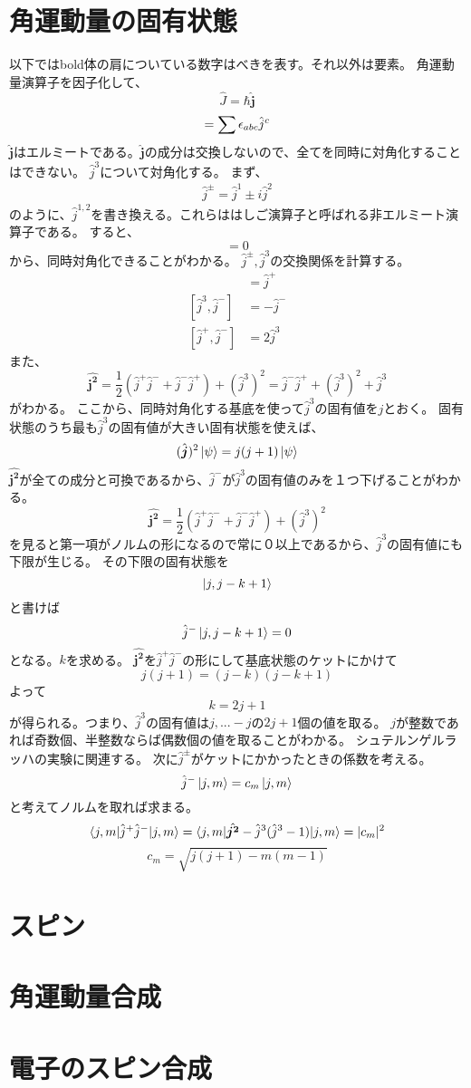 \documentclass{jsarticle}
\newcommand{\half}{\frac{1}{2}}
\newcommand{\beq}{\begin{equation}}
\newcommand{\eeq}{\end{equation}}
\newcommand{\hj}{\hat{j}}
\newcommand{\hjm}{\hat{j}^{-}}
\newcommand{\hjp}{\hat{j}^{+}}
\newcommand{\hbj}{\hat{\bm{j}}}
\newcommand{\hbjt}{\hat{\bm{j^2}}}
\newcommand{\hcj}{\hat{J}}
\newcommand{\cjm}{\sqrt{j(j+1) - m(m-1)}}
\begin{document}
\section{角運動量の固有状態}
以下ではbold体の肩についている数字はべきを表す。それ以外は要素。
角運動量演算子を因子化して、
\beq
    \hcj = \hbar \hbj
\eeq
\beq
[\hj^a,\hj^b] = \sum \epsilon_{abc}\hj^c\\
\eeq
$\hbj$はエルミートである。$\hbj$の成分は交換しないので、全てを同時に対角化することはできない。
$\hj^3$について対角化する。
まず、
\begin{align}
    \hj^{\pm} = \hj^1 \pm i \hj^2
\end{align}
のように、$\hj^{1,2}$を書き換える。これらははしご演算子と呼ばれる非エルミート演算子である。
すると、
\beq
[\hbjt,\hj^3] = 0
\eeq
から、同時対角化できることがわかる。
$\hj^{\pm},\hj^3$の交換関係を計算する。
\begin{align}
    [\hj^3, \hj^{+}] &= \hj^{+}\\
[\hj^3, \hj^{-}] &= -\hj^{-}\\
[\hj^{+}, \hj^{-}] &= 2\hj^{3}
\end{align}
また、
\beq
\hbjt = \half (\hjp\hjm + \hjm\hjp) + (\hj^3)^2 =  \hjm\hjp + (\hj^3)^2 + \hj^3
\eeq
がわかる。
ここから、同時対角化する基底を使って$\hj^3$の固有値を$j$とおく。
固有状態のうち最も$\hj^3$の固有値が大きい固有状態を使えば、
\beq
    (\hbj)^2 \ket{\psi} = j(j+1)\ket{\psi}
\eeq
$\hbjt$が全ての成分と可換であるから、$\hjm$が$\hj^3$の固有値のみを１つ下げることがわかる。
\beq
\hbjt = \half (\hjp\hjm + \hjm\hjp) + (\hj^3)^2
\eeq
を見ると第一項がノルムの形になるので常に０以上であるから、$\hj^3$の固有値にも下限が生じる。
その下限の固有状態を
\beq
    \ket{j, j-k+1}
\eeq
と書けば
\beq
    \hjm\ket{j, j-k+1} = 0
\eeq
となる。$k$を求める。
$\hbjt$を$\hjp\hjm$の形にして基底状態のケットにかけて
\beq
    j(j+1) = (j-k)(j-k+1)
\eeq
よって
\beq
    k = 2j + 1
\eeq
が得られる。つまり、$\hj^3$の固有値は$j,...-j$の$2j+1$個の値を取る。
$j$が整数であれば奇数個、半整数ならば偶数個の値を取ることがわかる。
シュテルンゲルラッハの実験に関連する。
次に$\hj^{\pm}$がケットにかかったときの係数を考える。
\beq
\hjm \ket{j,m} = c_m \ket{j,m}
\eeq
と考えてノルムを取れば求まる。
\beq
\braket{j,m|\hjp\hjm|j,m} = \braket{j,m|\hbjt - \hj^3 (\hj^3 - 1)|j,m} = |c_m|^2
\eeq
\beq
    c_m = \cjm
\eeq
\section{スピン}

\section{角運動量合成}
\section{電子のスピン合成}
\end{document}
